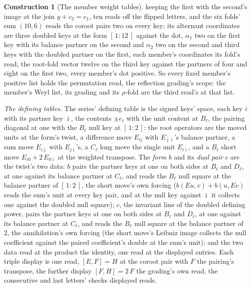 \documentclass[11pt]{article}
\theoremstyle{definition}
\newtheorem{construction}{Construction}
\begin{document}
\begin{construction}[The member weight tables]
keeping the first with the second's image at the join
$y+c_2=c_1$, ten reads off the flipped letters, and the six
folds' sum $(10,6)$ reads the coroot pairs two on every key; its
alternant coordinates are three doubled keys at the form
$[\,1:12\,]$ against the dot, $\alpha_1$ two on the first key
with its balance partner on the second and $\alpha_2$ two on the
second and third keys with the doubled partner on the first,
each member's coordinates its fold's read, the root-fold vector
twelve on the third key against the partners of four and eight
on the first two, every member's dot positive.
So every fixed member's positive list holds the permutation
read, the reflection grading's scope: the member's Weyl list,
its grading and its $\rho$-fold are the third read's at that
list.

\emph{The defining tables.} The series' defining table is the
signed keys' space, each key $i$ with its partner key
$\bar\imath$, the contents $\pm e_i$ with the unit content at
$B_\ell$, the pairing diagonal at one with the $B_\ell$ null
key at $[\,1:2\,]$: the root operators are the moved units at
the form's twist, a difference move $E_{ij}$ with
$E_{\bar\jmath\bar\imath}$'s balance partner, a sum move
$E_{i\bar\jmath}$ with $E_{j\bar\imath}$'s, a $C_\ell$ long
move the single unit $E_{i\bar\imath}$, and a $B_\ell$ short
move $E_{i0}+2\,E_{0\bar\imath}$ at the weighted transpose. The
\emph{form} $b$ and its \emph{dual pair} $c$ are the twist's two
data: $b$ pairs the partner keys at one on both sides at $B_\ell$
and $D_\ell$, at one against its balance partner at $C_\ell$, and
reads the $B_\ell$ null square at the balance partner of
$[\,1:2\,]$, the short move's own forcing ($b(Eu,v)+b(u,Ev)$
reads the sum's unit at every key pair, and at the null key
against $\bar\imath$ it collects one against the doubled null
square); $c$, the invariant line of the doubled defining power,
pairs the partner keys at one on both sides at $B_\ell$ and
$D_\ell$, at one against its balance partner at $C_\ell$, and
reads the $B_\ell$ null square at the balance partner of $2$, the
annihilation's own forcing (the short move's Leibniz image
collects the null coefficient against the paired coefficient's
double at the sum's unit); and the two data read at the product
the identity, one read at the displayed entries. Each
triple display is one read, $[E,F]=H$ at the coroot pair with
$F$ the pairing's transpose, the further display $[F,H]=2\,F$
the grading's own read, the consecutive and last letters'
checks displayed reads.


\end{construction}
\end{document}
